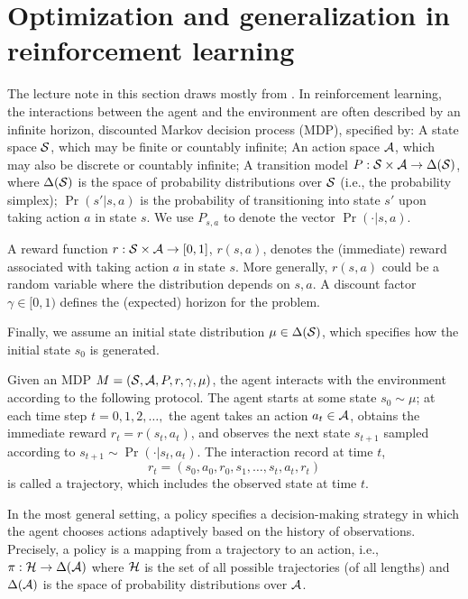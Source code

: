 \section{Optimization and generalization in reinforcement learning}

The lecture note in this section draws mostly from \citet{agarwal2019reinforcement}.
In reinforcement learning, the interactions between the agent and the environment are often described by an infinite horizon, discounted Markov decision process (MDP), specified by:
A state space $\mathcal{S}$, which may be finite or countably infinite;
An action space $\mathcal{A}$, which may also be discrete or countably infinite;
A transition model $P: \mathcal{S} \times \mathcal{A} \rightarrow \Delta(\mathcal{S})$, where $\Delta(\mathcal{S})$ is the space of probability distributions over $\mathcal{S}$ (i.e., the probability simplex);
$\Pr(s' | s, a)$ is the probability of transitioning into state $s'$ upon taking action $a$ in state $s$.
We use $P_{s, a}$ to denote the vector $\Pr(\cdot | s, a)$.
     
A reward function $r: \mathcal{S} \times \mathcal{A} \rightarrow [0, 1]$, $r(s, a)$, denotes the (immediate) reward associated with taking action $a$ in state $s$.
More generally, $r(s, a)$ could be a random variable where the distribution depends on $s, a$.
A discount factor $\gamma \in [0, 1)$ defines the (expected) horizon for the problem.

Finally, we assume an initial state distribution $\mu \in \Delta(\mathcal{S})$, which specifies how the initial state $s_0$ is generated.

Given an MDP $M = (\mathcal{S}, \mathcal{A}, P, r, \gamma, \mu)$, the agent interacts with the environment according to the following protocol.
The agent starts at some state $s_0 \sim \mu$; at each time step $t = 0, 1, 2, \dots,$ the agent takes an action $a_t \in \mathcal{A}$, obtains the immediate reward $r_t = r(s_t, a_t)$, and observes the next state $s_{t+1 }$ sampled according to $s_{t + 1} \sim \Pr(\cdot | s_t, a_t)$.
The interaction record at time $t$,
\[ r_t = (s_0, a_0, r_0, s_1, \dots, s_t, a_t, r_t) \]
is called a trajectory, which includes the observed state at time $t$.

In the most general setting, a policy specifies a decision-making strategy in which the agent chooses actions adaptively based on the history of observations.
Precisely, a policy is a mapping from a trajectory to an action, i.e., $\pi: \mathcal{H} \rightarrow \Delta(\mathcal{A})$ where $\mathcal{H}$ is the set of all possible trajectories (of all lengths) and $\Delta(\mathcal{A})$ is the space of probability distributions over $\mathcal{A}$.

